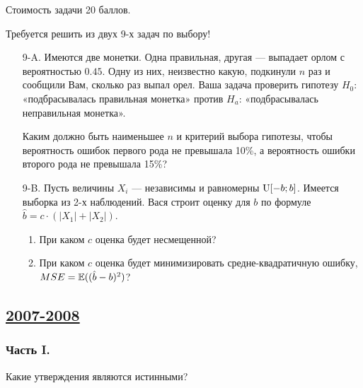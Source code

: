 Стоимость задачи 20 баллов.

Требуется решить \textbf{} из двух 9-х задач по
выбору!

\begin{enumerate}
\item[9-A.] Имеются две монетки. Одна правильная, другая — выпадает орлом с
вероятностью $0.45$. Одну из них, неизвестно какую, подкинули $n$
раз и сообщили Вам, сколько раз выпал орел. Ваша задача проверить
гипотезу $H_{0}$: «подбрасывалась правильная монетка» против
$H_{a}$:
«подбрасывалась неправильная монетка».

Каким должно быть наименьшее $n$ и критерий выбора гипотезы, чтобы
вероятность ошибок первого рода не превышала 10\%, а вероятность
ошибки второго рода не превышала 15\%?

\item[9-B.] Пусть величины $X_{i}$ — независимы и равномерны $\mathrm{U}[-b;b]$. Имеется выборка из 2-х наблюдений. Вася строит оценку для $b$ по формуле $\hat{b}=c\cdot (|X_{1}|+|X_{2}|)$.
\begin{enumerate}
\item При каком $c$ оценка будет несмещенной?
\item При каком $c$ оценка будет минимизировать средне-квадратичную ошибку, $MSE=\operatorname{\mathbb{E}}((\hat{b}-b)^{2})$?
\end{enumerate}
\end{enumerate}



\subsection[2007-2008]{\hyperref[sec:sol_kr_03_2007_2008]{2007-2008}}
\label{sec:kr_03_2007_2008}



\subsubsection*{Часть I.}

Какие утверждения являются истинными?

